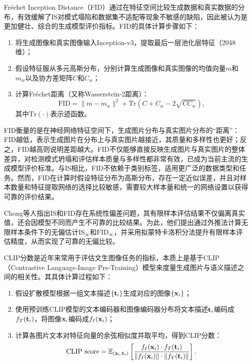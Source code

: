\documentclass[11pt,a4paper,UTF8]{ctexart}
\begin{document}
Fr\'echet Inception Distance（FID）\cite{dowson1982frechet}通过在特征空间比较生成数据和真实数据的分布，有效缓解了IS对模式塌陷和数据集不适配等现象不敏感的缺陷，因此被认为是更加健壮、综合的生成模型评价指标。FID的具体计算步骤如下：
\begin{enumerate}
    \item 将生成图像和真实图像输入Inception-v3，提取最后一层池化层特征（2048维）；
    \item 假设特征服从多元高斯分布，分别计算生成图像和真实图像的均值向量$m$和$m_w$以及协方差矩阵$C$和$C_w$；
    \item 计算Fr\'echet距离（又称Wasserstein-2距离）：
    \begin{equation*}
        \text{FID}=\|m-m_w \|^2 + \text{Tr}(C+C_w-2\sqrt{CC_w}),
    \end{equation*}
    其中$\text{Tr}(\cdot)$表示迹函数。
\end{enumerate}

FID衡量的是在神经网络特征空间下，生成图片分布与真实图片分布的“距离”：FID越低，表示生成图片在分布上与真实图片越接近，其质量和多样性也更好；反之，FID越高则说明差距越大。FID不仅能够直接反映生成图片与真实图片的整体差异，对检测模式坍塌和评估样本质量与多样性都非常有效，已成为当前主流的生成模型评价标准。与IS相比，FID不依赖于类别标签，适用更广泛的数据类型和任务。然而，FID在计算时假设特征分布为高斯分布，存在一定近似误差，并且对样本数量和特征提取网络的选择比较敏感，需要较大样本量和统一的网络设置以获得可靠的评价结果。

Chong等人\cite{chong2020effectively}指出IS和FID存在系统性偏差问题，其有限样本评估结果不仅偏离真实值，还会因模型不同而产生不可靠的比较结果。为此，他们提出通过外推法计算无限样本条件下的无偏估计$\text{IS}_\infty$和$\text{FID}_\infty$，并采用拟蒙特卡洛积分法提升有限样本评估精度，从而实现了可靠的无偏比较。

CLIP分数是近年来常用于评估文生图像任务的指标，本质上是基于CLIP（Contrastive Language-Image Pre-Training）\cite{radford2021learning}模型来度量生成图片与语义描述之间的相关性。其具体计算过程如下：
\begin{enumerate}
    \item 假设扩散模型根据一组文本描述$\{\mathbf{t}_i\}$生成对应的图像$\{\mathbf{x}_i\}$；
    \item 使用预训练CLIP模型的文本编码器和图像编码器分布将文本描述$\mathbf{t}_i$编码成$f_T(\mathbf{t}_i)$，将图像$\mathbf{x}_i$编码成$f_I(\mathbf{x}_i)$；
    \item 计算各图片文本对特征向量的余弦相似度并取平均，得到CLIP分数：
    \begin{equation*}
    \text{CLIP score}=\mathbb{E}_{(\mathbf{x}_i,\mathbf{t}_i)}\left[\frac{f_I(\mathbf{x}_i)\cdot f_T(\mathbf{t}_i)}{\|f_I(\mathbf{x}_i)\|\cdot\|f_T(\mathbf{t}_i)\|}\right].
    \end{equation*}  
\end{enumerate}
\end{document}
